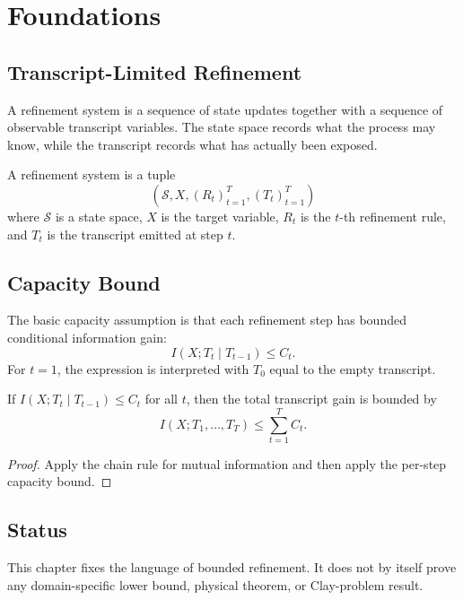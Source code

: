 \chapter{Foundations}

\section{Transcript-Limited Refinement}

A refinement system is a sequence of state updates together with a sequence of observable transcript variables.  The state space records what the process may know, while the transcript records what has actually been exposed.

\begin{definition}
A refinement system is a tuple
\[
(\mathcal S, X, (R_t)_{t=1}^T, (T_t)_{t=1}^T)
\]
where \(\mathcal S\) is a state space, \(X\) is the target variable, \(R_t\) is the \(t\)-th refinement rule, and \(T_t\) is the transcript emitted at step \(t\).
\end{definition}

\section{Capacity Bound}

The basic capacity assumption is that each refinement step has bounded conditional information gain:
\[
I(X;T_t \mid T_{t-1}) \le C_t .
\]
For \(t=1\), the expression is interpreted with \(T_0\) equal to the empty transcript.

\begin{lemma}
If \(I(X;T_t \mid T_{t-1}) \le C_t\) for all \(t\), then the total transcript gain is bounded by
\[
I(X;T_1,\ldots,T_T) \le \sum_{t=1}^T C_t .
\]
\end{lemma}

\begin{proof}
Apply the chain rule for mutual information and then apply the per-step capacity bound.
\end{proof}

\section{Status}

This chapter fixes the language of bounded refinement.  It does not by itself prove any domain-specific lower bound, physical theorem, or Clay-problem result.

